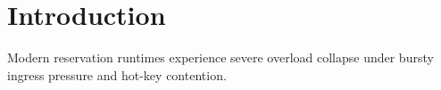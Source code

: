 \section{Introduction}

Modern reservation runtimes experience severe overload collapse under bursty ingress pressure and hot-key contention.

